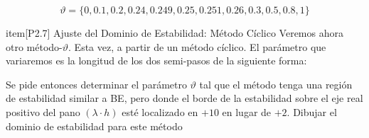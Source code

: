 \documentclass{article}
\begin{document}
\begin{itemize}
\begin{equation}
\vartheta = \{0, 0.1, 0.2, 0.24, 0.249, 0.25, 0.251, 0.26, 0.3, 0.5, 0.8, 1\} \tag{P2.6b}
\end{equation}

item[P2.7] Ajuste del Dominio de Estabilidad: Método Cíclico Veremos ahora otro método-$\vartheta$. Esta vez, a partir de un método cíclico. El parámetro que variaremos es la longitud de los dos semi-pasos de la siguiente forma:

Se pide entonces determinar el parámetro $\vartheta$ tal que el método tenga una región de estabilidad similar a BE, pero donde el borde de la estabilidad sobre el eje real positivo del pano $(\lambda \cdot h)$ esté localizado en $+10$ en lugar de $+2$.
Dibujar el dominio de estabilidad para este método
\end{itemize}
\end{document}
